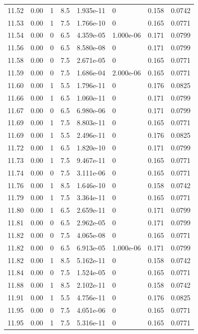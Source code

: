 \documentclass[preview]{standalone}
\begin{document}
{{{{{{{{{{{{{\begin{tabular}{L{1.2cm}C{1.2cm} C{0.3cm}C{0.5cm} C{1.4cm}C{1.4cm} C{1.4cm}C{1.4cm}}
  11.52  &  0.00  & 1     & 8.5 &  1.935e-11  & 0  & 0.158 &  0.0742   \\ 
  11.53  &  0.00  & 1     & 7.5 &  1.766e-10  & 0  & 0.165 &  0.0771   \\ 
  11.54  &  0.00  & 0     & 6.5 &  4.359e-05  & 1.000e-06  & 0.171 &  0.0799   \\ 
  11.56  &  0.00  & 0     & 6.5 &  8.580e-08  & 0  & 0.171 &  0.0799   \\ 
  11.58  &  0.00  & 0     & 7.5 &  2.671e-05  & 0  & 0.165 &  0.0771   \\ 
  11.59  &  0.00  & 0     & 7.5 &  1.686e-04  & 2.000e-06  & 0.165 &  0.0771   \\ 
  11.60  &  0.00  & 1     & 5.5 &  1.796e-11  & 0  & 0.176 &  0.0825   \\ 
  11.66  &  0.00  & 1     & 6.5 &  1.060e-11  & 0  & 0.171 &  0.0799   \\ 
  11.67  &  0.00  & 0     & 6.5 &  6.980e-06  & 0  & 0.171 &  0.0799   \\ 
  11.69  &  0.00  & 1     & 7.5 &  8.803e-11  & 0  & 0.165 &  0.0771   \\ 
  11.69  &  0.00  & 1     & 5.5 &  2.496e-11  & 0  & 0.176 &  0.0825   \\ 
  11.72  &  0.00  & 1     & 6.5 &  1.820e-10  & 0  & 0.171 &  0.0799   \\ 
  11.73  &  0.00  & 1     & 7.5 &  9.467e-11  & 0  & 0.165 &  0.0771   \\ 
  11.74  &  0.00  & 0     & 7.5 &  3.111e-06  & 0  & 0.165 &  0.0771   \\ 
  11.76  &  0.00  & 1     & 8.5 &  1.646e-10  & 0  & 0.158 &  0.0742   \\ 
  11.79  &  0.00  & 1     & 7.5 &  3.364e-11  & 0  & 0.165 &  0.0771   \\ 
  11.80  &  0.00  & 1     & 6.5 &  2.659e-11  & 0  & 0.171 &  0.0799   \\ 
  11.81  &  0.00  & 0     & 6.5 &  2.962e-05  & 0  & 0.171 &  0.0799   \\ 
  11.82  &  0.00  & 0     & 7.5 &  4.065e-08  & 0  & 0.165 &  0.0771   \\ 
  11.82  &  0.00  & 0     & 6.5 &  6.913e-05  & 1.000e-06  & 0.171 &  0.0799   \\ 
  11.82  &  0.00  & 1     & 8.5 &  5.162e-11  & 0  & 0.158 &  0.0742   \\ 
  11.84  &  0.00  & 0     & 7.5 &  1.524e-05  & 0  & 0.165 &  0.0771   \\ 
  11.88  &  0.00  & 1     & 8.5 &  2.102e-11  & 0  & 0.158 &  0.0742   \\ 
  11.91  &  0.00  & 1     & 5.5 &  4.756e-11  & 0  & 0.176 &  0.0825   \\ 
  11.95  &  0.00  & 0     & 7.5 &  4.051e-06  & 0  & 0.165 &  0.0771   \\ 
  11.95  &  0.00  & 1     & 7.5 &  5.316e-11  & 0  & 0.165 &  0.0771   \\ 
\hline 
\end{tabular} 

}}}}}}}}}}}}}
\end{document}
